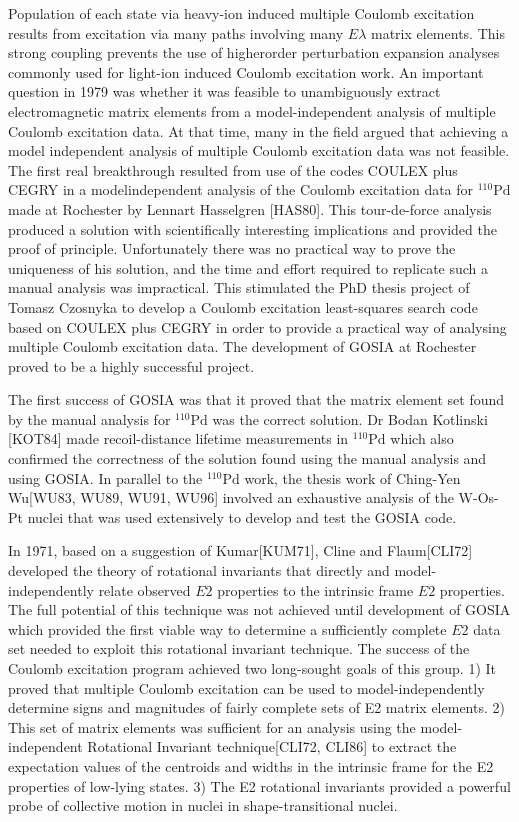 \documentclass[10pt]{article}
\begin{document}
Population of each state via heavy-ion induced multiple Coulomb excitation results from excitation via many paths involving many $E \lambda$ matrix elements. This strong coupling prevents the use of higherorder perturbation expansion analyses commonly used for light-ion induced Coulomb excitation work. An important question in 1979 was whether it was feasible to unambiguously extract electromagnetic matrix elements from a model-independent analysis of multiple Coulomb excitation data. At that time, many in the field argued that achieving a model independent analysis of multiple Coulomb excitation data was not feasible. The first real breakthrough resulted from use of the codes COULEX plus CEGRY in a modelindependent analysis of the Coulomb excitation data for ${ }^{110} \mathrm{Pd}$ made at Rochester by Lennart Hasselgren [HAS80]. This tour-de-force analysis produced a solution with scientifically interesting implications and provided the proof of principle. Unfortunately there was no practical way to prove the uniqueness of his solution, and the time and effort required to replicate such a manual analysis was impractical. This stimulated the PhD thesis project of Tomasz Czosnyka to develop a Coulomb excitation least-squares search code based on COULEX plus CEGRY in order to provide a practical way of analysing multiple Coulomb excitation data. The development of GOSIA at Rochester proved to be a highly successful project.

The first success of GOSIA was that it proved that the matrix element set found by the manual analysis for ${ }^{110} \mathrm{Pd}$ was the correct solution. Dr Bodan Kotlinski [KOT84] made recoil-distance lifetime measurements in ${ }^{110} \mathrm{Pd}$ which also confirmed the correctness of the solution found using the manual analysis and using GOSIA. In parallel to the ${ }^{110} \mathrm{Pd}$ work, the thesis work of Ching-Yen Wu[WU83, WU89, WU91, WU96] involved an exhaustive analysis of the W-Os-Pt nuclei that was used extensively to develop and test the GOSIA code.

In 1971, based on a suggestion of Kumar[KUM71], Cline and Flaum[CLI72] developed the theory of rotational invariants that directly and model-independently relate observed $E 2$ properties to the intrinsic frame $E 2$ properties. The full potential of this technique was not achieved until development of GOSIA which provided the first viable way to determine a sufficiently complete $E 2$ data set needed to exploit this rotational invariant technique. The success of the Coulomb excitation program achieved two long-sought goals of this group. 1) It proved that multiple Coulomb excitation can be used to model-independently determine signs and magnitudes of fairly complete sets of E2 matrix elements. 2) This set of matrix elements was sufficient for an analysis using the model-independent Rotational Invariant technique[CLI72, CLI86] to extract the expectation values of the centroids and widths in the intrinsic frame for the E2 properties of low-lying states. 3) The E2 rotational invariants provided a powerful probe of collective motion in nuclei in shape-transitional nuclei.
\end{document}
